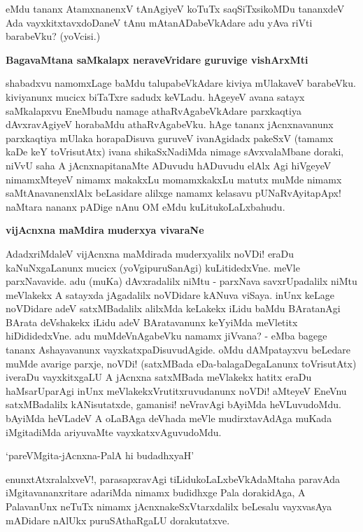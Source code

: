 \noindent
eMdu tananx AtamxnanenxV tAnAgiyeV koTuTx saqSiTxsikoMDu tananxdeV Ada vayxkitxtavxdoDaneV tAnu mAta\-nADa\-beVkAdare adu yAva riVti barabeVku? (yoVcisi.)

{\bigskip
\noindent
{\large\bf BagavaMtana saMkalapx neraveVridare guruvige vishArxMti}}\label{page71}
\medskip

\noindent
shabadxvu namomxLage baMdu talupabeVkAdare kiviya mUlakaveV barabeVku. kiviyanunx mucicx biTaTxre sadudx \-keVLadu. hAgeyeV avana satayx saMkalapxvu EneMbudu namage athaRvAgabeVkAdare parxkaqtiya dAvxra\-vAgiyeV horabaMdu athaRvAgabeVku. hAge tananx jAcnxnavanunx parxkaqtiya mUlaka horapaDisuva guru\-veV ivanAgidadx pakeSxV (tamamx kaDe keY toVrisutAtx) ivana shikaSxNadiMda nimage sAvxvalaMbane doraki, niVvU saha A jAcnxna\-pita\-naMte ADuvudu hADuvudu elAlx Agi hiVgeyeV nimamxMteyeV nimamx makakxLu momamx\-kakxLu matutx muMde nimamx saMtAnavanenxlAlx beLasidare alilxge namamx kelasavu pUNaRvAyitapApx! naMtara nananx pADige nAnu OM eMdu kuLitukoLaLxbahudu.

{\bigskip
\noindent
{\large\bf vijAcnxna maMdira muderxya vivaraNe}}
\medskip

\noindent
AdadxriMdaleV vijAcnxna maMdirada muderxyalilx noVDi! eraDu kaNuNxgaLanunx mucicx (yoVgipuruSa\-nAgi) kuLitidedxVne. meVle parxNavavide. adu (muKa) dAvxradalilx niMtu - parxNava savxrUpadalilx niMtu meVlakekx A satayxda jAgadalilx noVDidare kANuva viSaya. inUnx keLage noVDidare adeV satxMBadalilx alilxMda keLakekx iLidu baMdu BAratanAgi BArata deVshakekx iLidu adeV BAratavanunx keYyiMda meVletitx hiDididedxVne. adu muMdeVnAgabeVku namamx jiVvana? - eMba bagege tananx Ashayavanunx vayxkatxpaDisuvudAgide. oMdu dAMpatayxvu beLedare muMde avarige parxje, noVDi! (satxMBada eDa-balagaDegaLanunx toVrisutAtx) iveraDu vayxkitxgaLU A jAcnxna satxMBada meVlakekx hatitx eraDu haMsarUparAgi inUnx meVlakekxVrutitxruvudanunx noVDi! aMteyeV EneVnu satxMBadalilx kANisutatxde, gamanisi! neVravAgi bAyiMda heVLuvudoMdu. bAyiMda heVLadeV A oLaBAga deVhada meVle mudirxtavAdAga muKada iMgitadiMda ariyuvaMte vayxkatxvAguvu\-doMdu.

\begin{shloka}
`pareVMgita-jAcnxna-PalA hi budadhxyaH'\label{page72}
\end{shloka}

\noindent
enunxtAtxralalxveV!, parasapxravAgi tiLidukoLaLxbeVkAdaMtaha paravAda iMgitavananxritare adariMda nimamx bu\-didhxge Pala dorakidAga, A PalavanUnx neTuTx nimamx jAcnxnakeSxVtarxdalilx beLesalu vayxvasAya mADidare nAlUkx puruSAthaRgaLU dorakutatxve.

